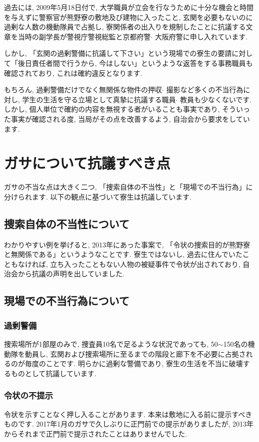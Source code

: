 \documentclass[10pt,b5jsbook,dvips,dvipdfmx,openany]{jsbook}
\theoremstyle{definition}
\begin{document}
		過去には, 2009年5月18日付で, 大学職員が立会を行なうために十分な機会と時間を与えずに警察官が熊野寮の敷地及び建物に入ったこと, 玄関を必要もないのに過剰な人数の機動隊員で占拠し, 寮関係者の出入りを規制したことに抗議する文章を当時の副学長が警視庁警視総監と京都府警$ \cdot $ 大阪府警に申し入れています. 

 		しかし, 「玄関の過剰警備に抗議して下さい」という現場での寮生の要請に対して「後日責任者間で行うから, 今はしない」というような返答をする事務職員も確認されており, これは確約違反となります. 
 
 		もちろん, 過剰警備だけでなく無関係な物件の押収$ \cdot $ 撮影など多くの不当行為に対し, 学生の生活を守る立場として真摯に抗議する職員$ \cdot $ 教員も少なくないです. しかし, 個人単位で確約の内容を無視する者がいることも事実であり, そういった事実が確認される度, 当局がその点を改善するよう, 自治会から要求をしています. 


	\section{ガサについて抗議すべき点}
	ガサの不当な点は大きく二つ, 「捜索自体の不当性」と「現場での不当行為」に分けられます. 以下の観点に基づいて寮生は抗議しています. 

		\subsection{捜索自体の不当性について}
		 わかりやすい例を挙げると, 2013年にあった事案で, 「令状の捜索目的が熊野寮と無関係である」というようなことです. 寮生ではないし, 過去に住んでいたこともなければ, 立ち入ったこともない人物の被疑事件で令状が出されており, 自治会から抗議の声明を出していました. 

		\subsection{現場での不当行為について}
			\subsubsection{過剰警備}
			捜索場所が1部屋のみで, 捜査員10名で足るような状況であっても, 50$\sim$150名の機動隊を動員し, 玄関および捜索場所に至るまでの階段と廊下を不必要に占拠されるのが毎度のことです. 明らかに過剰な警備であり, 寮生の生活を不当に破壊するものとして抗議しています. 

			\subsubsection{令状の不提示}
			令状を示すことなく押し入ることがあります. 本来は敷地に入る前に提示すべきものです. 2017年1月のガサで久しぶりに正門前での提示がありましたが, 2013年からそれまで正門前で提示されたことはありませんでした. 
\end{document}
